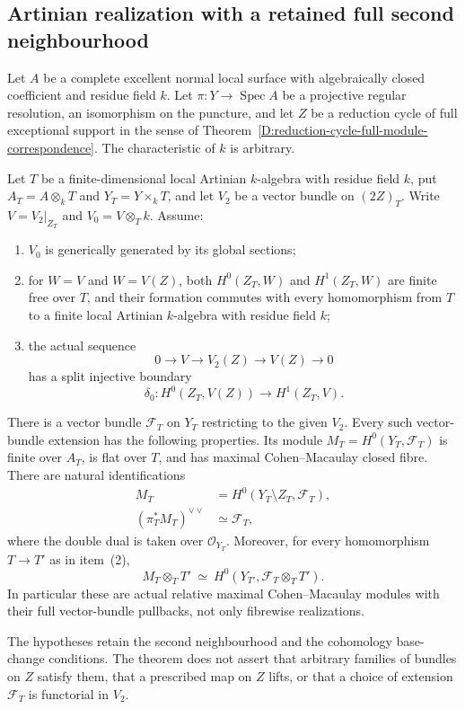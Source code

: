 \subsection{Artinian realization with a retained full second neighbourhood}

\begin{theorem}
\label{D:Artinian-full-neighbourhood-realization}
Let $A$ be a complete excellent normal local surface with
algebraically closed coefficient and residue field $k$. Let
$\pi:Y\to\operatorname{Spec}A$ be a projective regular resolution,
an isomorphism on the puncture, and let $Z$ be a reduction cycle
of full exceptional support in the sense of
Theorem~\ref{D:reduction-cycle-full-module-correspondence}.
The characteristic of $k$ is arbitrary.

Let $T$ be a finite-dimensional local Artinian $k$-algebra with
residue field $k$, put $A_T=A\otimes_kT$ and $Y_T=Y\times_kT$,
and let $V_2$ be a vector bundle on $(2Z)_T$. Write
$V=V_2|_{Z_T}$ and $V_0=V\otimes_Tk$. Assume:
\begin{enumerate}
\item $V_0$ is generically generated by its global sections;
\item for $W=V$ and $W=V(Z)$, both $H^0(Z_T,W)$ and
$H^1(Z_T,W)$ are finite free over $T$, and their formation
commutes with every homomorphism from $T$ to a finite local
Artinian $k$-algebra with residue field $k$;
\item the actual sequence
\[
 0\longrightarrow V\longrightarrow V_2(Z)
       \longrightarrow V(Z)\longrightarrow0
\]
has a split injective boundary
\[
 \delta_0:H^0(Z_T,V(Z))\longrightarrow H^1(Z_T,V).
                                                        \tag{D.AR.1}
\]
\end{enumerate}
There is a vector bundle $\mathcal F_T$ on $Y_T$ restricting
to the given $V_2$. Every such vector-bundle extension has the
following properties. Its module
$M_T=H^0(Y_T,\mathcal F_T)$ is finite over $A_T$, is flat
over $T$, and has maximal Cohen--Macaulay closed fibre.
There are natural identifications
\[
 \begin{split}
 M_T&=H^0(Y_T\setminus Z_T,\mathcal F_T),\\
 (\pi_T^*M_T)^{\vee\vee}&\simeq\mathcal F_T ,
 \end{split}                                           \tag{D.AR.2}
\]
where the double dual is taken over $\mathcal O_{Y_T}$.
Moreover, for every homomorphism $T\to T'$ as in item~(2),
\[
 M_T\otimes_TT'\ \simeq\
 H^0(Y_{T'},\mathcal F_T\otimes_TT').                    \tag{D.AR.3}
\]
In particular these are actual relative maximal
Cohen--Macaulay modules with their full vector-bundle pullbacks,
not only fibrewise realizations.

The hypotheses retain the second neighbourhood and the
cohomology base-change conditions. The theorem does not
assert that arbitrary families of bundles on $Z$ satisfy them,
that a prescribed map on $Z$ lifts, or that a choice of
extension $\mathcal F_T$ is functorial in $V_2$.
\end{theorem}

